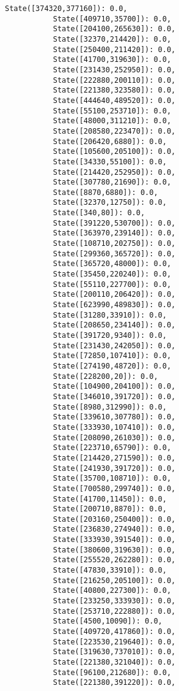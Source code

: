 \documentclass[11pt]{article}
\begin{document}
\begin{Verbatim}[commandchars=\\\{\}]
           State([374320,377160]): 0.0,
           State([409710,35700]): 0.0,
           State([204100,265630]): 0.0,
           State([32370,214420]): 0.0,
           State([250400,211420]): 0.0,
           State([41700,319630]): 0.0,
           State([231430,252950]): 0.0,
           State([222880,200110]): 0.0,
           State([221380,323580]): 0.0,
           State([444640,489520]): 0.0,
           State([55100,253710]): 0.0,
           State([48000,311210]): 0.0,
           State([208580,223470]): 0.0,
           State([206420,6880]): 0.0,
           State([105600,205100]): 0.0,
           State([34330,55100]): 0.0,
           State([214420,252950]): 0.0,
           State([307780,21690]): 0.0,
           State([8870,6880]): 0.0,
           State([32370,12750]): 0.0,
           State([340,80]): 0.0,
           State([391220,530700]): 0.0,
           State([363970,239140]): 0.0,
           State([108710,202750]): 0.0,
           State([299360,365720]): 0.0,
           State([365720,48000]): 0.0,
           State([35450,220240]): 0.0,
           State([55110,227700]): 0.0,
           State([200110,206420]): 0.0,
           State([623990,489830]): 0.0,
           State([31280,33910]): 0.0,
           State([208650,234140]): 0.0,
           State([391720,9340]): 0.0,
           State([231430,242050]): 0.0,
           State([72850,107410]): 0.0,
           State([274190,48720]): 0.0,
           State([228200,20]): 0.0,
           State([104900,204100]): 0.0,
           State([346010,391720]): 0.0,
           State([8980,312990]): 0.0,
           State([339610,307780]): 0.0,
           State([333930,107410]): 0.0,
           State([208090,261030]): 0.0,
           State([223710,65790]): 0.0,
           State([214420,271590]): 0.0,
           State([241930,391720]): 0.0,
           State([35700,108710]): 0.0,
           State([700580,299740]): 0.0,
           State([41700,11450]): 0.0,
           State([200710,8870]): 0.0,
           State([203160,250400]): 0.0,
           State([236830,274940]): 0.0,
           State([333930,391540]): 0.0,
           State([380600,319630]): 0.0,
           State([255520,262280]): 0.0,
           State([47830,33910]): 0.0,
           State([216250,205100]): 0.0,
           State([40800,227300]): 0.0,
           State([233250,333930]): 0.0,
           State([253710,222880]): 0.0,
           State([4500,10090]): 0.0,
           State([409720,417860]): 0.0,
           State([223530,219640]): 0.0,
           State([319630,737010]): 0.0,
           State([221380,321040]): 0.0,
           State([96100,212680]): 0.0,
           State([221380,391220]): 0.0,

\end{Verbatim}
\end{document}
